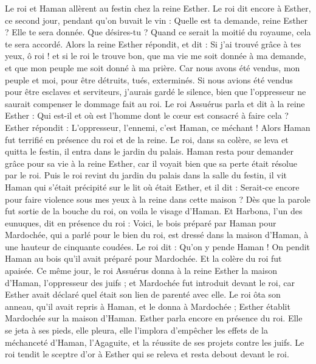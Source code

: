 \begin{multicols}{2}
\VerseOne{}Le roi et Haman allèrent au festin chez la reine Esther.
Le roi dit encore à Esther, ce second jour, pendant qu’on buvait le vin : Quelle est ta demande, reine Esther ? Elle te sera donnée. Que désires-tu ? Quand ce serait la moitié du royaume, cela te sera accordé.
Alors la reine Esther répondit, et dit : Si j'ai trouvé grâce à tes yeux, ô roi ! et si le roi le trouve bon, que ma vie me soit donnée à ma demande, et que mon peuple me soit donné à ma prière.
Car nous avons été vendus, mon peuple et moi, pour être détruits, tués, exterminés. Si nous avions été vendus pour être esclaves et serviteurs, j’aurais gardé le silence, bien que l'oppresseur ne saurait compenser le dommage fait au roi.
Le roi Assuérus parla et dit à la reine Esther : Qui est-il et où est l’homme dont le cœur est consacré à faire cela ?
Esther répondit : L'oppresseur, l'ennemi, c’est Haman, ce méchant ! Alors Haman fut terrifié en présence du roi et de la reine.
Le roi, dans sa colère, se leva et quitta le festin, il entra dans le jardin du palais. Haman resta pour demander grâce pour sa vie à la reine Esther, car il voyait bien que sa perte était résolue par le roi.
Puis le roi revint du jardin du palais dans la salle du festin, il vit Haman qui s’était précipité sur le lit où était Esther, et il dit : Serait-ce encore pour faire violence sous mes yeux à la reine dans cette maison ? Dès que la parole fut sortie de la bouche du roi, on voila le visage d'Haman.
Et Harbona, l'un des eunuques, dit en présence du roi : Voici, le bois préparé par Haman pour Mardochée, qui a parlé pour le bien du roi, est dressé dans la maison d'Haman, à une hauteur de cinquante coudées. Le roi dit : Qu’on y pende Haman !
On pendit Haman au bois qu'il avait préparé pour Mardochée. Et la colère du roi fut apaisée.
\VerseOne{}Ce même jour, le roi Assuérus donna à la reine Esther la maison d'Haman, l'oppresseur des juifs ; et Mardochée fut introduit devant le roi, car Esther avait déclaré quel était son lien de parenté avec elle.
Le roi ôta son anneau, qu'il avait repris à Haman, et le donna à Mardochée ; Esther établit Mardochée sur la maison d'Haman.
Esther parla encore en présence du roi. Elle se jeta à ses pieds, elle pleura, elle l’implora d’empêcher les effets de la méchanceté d'Haman, l’Agaguite, et la réussite de ses projets contre les juifs.
Le roi tendit le sceptre d'or à Esther qui se releva et resta debout devant le roi.

\end{multicols}
